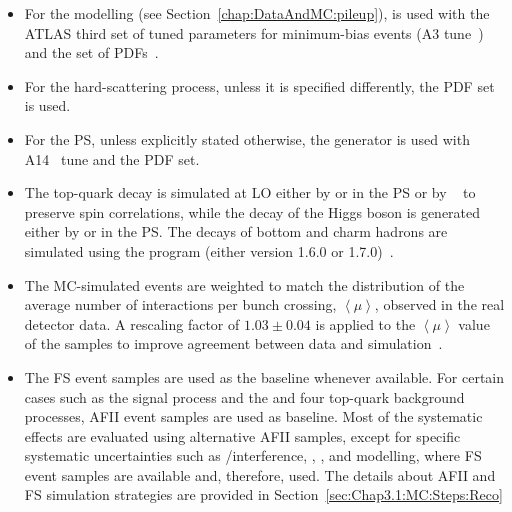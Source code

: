 \begin{itemize}
	\item For the \pileup modelling (see Section~\ref{chap:DataAndMC:pileup}), \PYTHIA[8.186]
	is used with the ATLAS third set of tuned parameters for minimum-bias events 
	(A3 tune~\cite{ATL-PHYS-PUB-2016-017}) and the \NNPDF[2.3lo] set of PDFs~\cite{Ball:2012cx}.

	\item For the hard-scattering process, unless it is specified differently, 
	the \NNPDF[3.0nlo] PDF set~\cite{Ball:2014uwa} is used.

	\item For the PS, unless explicitly stated otherwise, the \PYTHIA generator is used with 
	A14~\cite{ATL-PHYS-PUB-2014-021} tune and the \NNPDF[2.3lo] PDF set.
	
	\item The top-quark decay is simulated at LO either by \PYTHIA[8] or \HERWIG[7] in the PS or by 
	\MADSPIN~\cite{Frixione:2007vw, Artoisenet:2012st} 
	to preserve spin correlations, while the decay of the Higgs boson is generated either by \PYTHIA[8] 
	or \HERWIG[7] in the PS. 
	The decays of bottom and charm hadrons are simulated using the \EVTGEN program
	(either version 1.6.0 or 1.7.0)~\cite{Lange:2001uf}.

	\item	The MC-simulated events are weighted to match the distribution of the average 
	number of interactions per bunch crossing, \(\left<\mu \right>\), observed in the 
	real detector data. A rescaling factor of \(1.03\pm 0.04\) is applied 
	to the $\left<\mu \right>$ value of the samples to improve agreement between 
	data and simulation~\cite{STDM-2015-05}.%
 
	\item	The FS event samples are used as the baseline whenever 
	available. For certain cases such as the \tHq signal process and the \tHW
	and four top-quark background processes, AFII event samples are used as baseline.
	Most of the systematic effects are evaluated using alternative AFII samples, except for 
	specific systematic uncertainties such as \ttbar/\tW interference, \ttZ, \ttW, and \tWZ 
	modelling, where FS event samples are available and, therefore, used. 
	The details about AFII and FS simulation strategies are
	provided in Section~\ref{sec:Chap3.1:MC:Steps:Reco}
\end{itemize}

